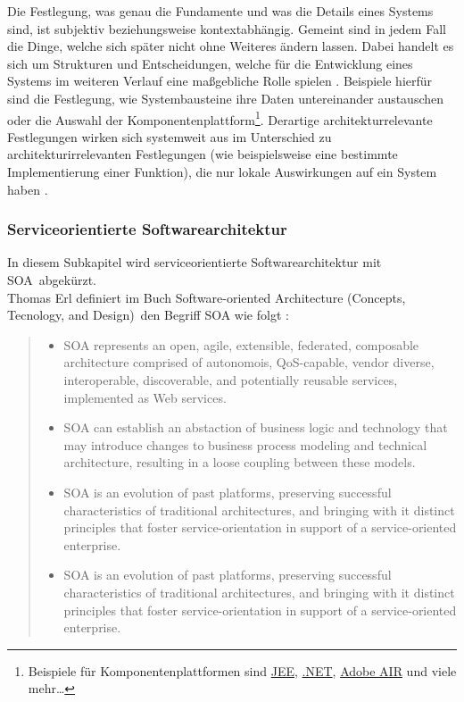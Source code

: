 Die Festlegung, was genau die Fundamente und was die Details eines Systems sind, ist subjektiv beziehungsweise kontextabhängig. Gemeint sind in jedem Fall die Dinge, welche sich später nicht ohne Weiteres ändern lassen. Dabei handelt es sich um Strukturen und Entscheidungen, welche für die Entwicklung eines Systems im weiteren Verlauf eine maßgebliche Rolle spielen \citereset \autocite{Fowler.2005}. Beispiele hierfür sind die Festlegung, wie Systembausteine ihre Daten untereinander austauschen oder die Auswahl der Komponentenplattform\footnote{Beispiele für Komponentenplattformen sind \href{http://www.oracle.com/technetwork/java/javaee}{JEE}, \href{http://www.microsoft.com/net}{.NET}, \href{http://www.adobe.com/at/products/air.html}{Adobe AIR} und viele mehr\ldots }. Derartige architekturrelevante Festlegungen wirken sich systemweit aus im Unterschied zu architekturirrelevanten Festlegungen (wie beispielsweise eine bestimmte Implementierung einer Funktion), die nur lokale Auswirkungen auf ein System haben \citereset \autocite{Bredemeyer.Malan.2004}.

\subsubsection{Serviceorientierte Softwarearchitektur}
\label{sec:2_Serviceorientierte_Softwarearchitektur}
In diesem Subkapitel wird serviceorientierte Softwarearchitektur mit \glqq SOA\grqq\ abgekürzt.\\

Thomas Erl definiert im Buch \glqq Software-oriented Architecture (Concepts, Tecnology, and Design)\grqq\ den Begriff SOA wie folgt :
\begin{quote}
\glqq
\begin{itemize}
\item SOA represents an open, agile, extensible, federated, composable architecture comprised of autonomois, QoS-capable, vendor diverse, interoperable, discoverable, and potentially reusable services, implemented as Web services.
\item SOA can establish an abstaction of business logic and technology that may introduce changes to business process modeling and technical architecture, resulting in a loose coupling between these models.
\item SOA is an evolution of past platforms, preserving successful characteristics of traditional architectures, and bringing with it distinct principles that foster service-orientation in support of a service-oriented enterprise.
\item SOA is an evolution of past platforms, preserving successful characteristics of traditional architectures, and bringing with it distinct principles that foster service-orientation in support of a service-oriented enterprise.
\grqq
\end{itemize}
\end{quote}




